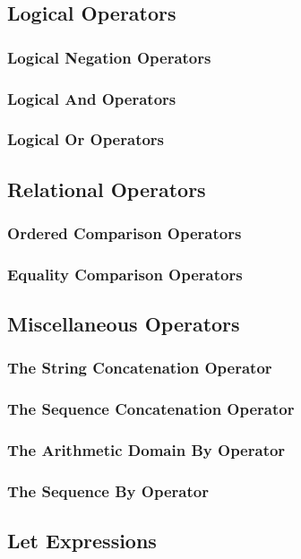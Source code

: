 \documentclass[10pt,twoside,titlepage]{article}
\begin{document}
\subsection{Logical Operators}
\subsubsection{Logical Negation Operators}
\subsubsection{Logical And Operators}
\subsubsection{Logical Or Operators}
\subsection{Relational Operators}
\subsubsection{Ordered Comparison Operators}
\subsubsection{Equality Comparison Operators}
\subsection{Miscellaneous Operators}
\subsubsection{The String Concatenation Operator}
\subsubsection{The Sequence Concatenation Operator}
\subsubsection{The Arithmetic Domain By Operator}
\subsubsection{The Sequence By Operator}
\subsection{Let Expressions}
\end{document}
